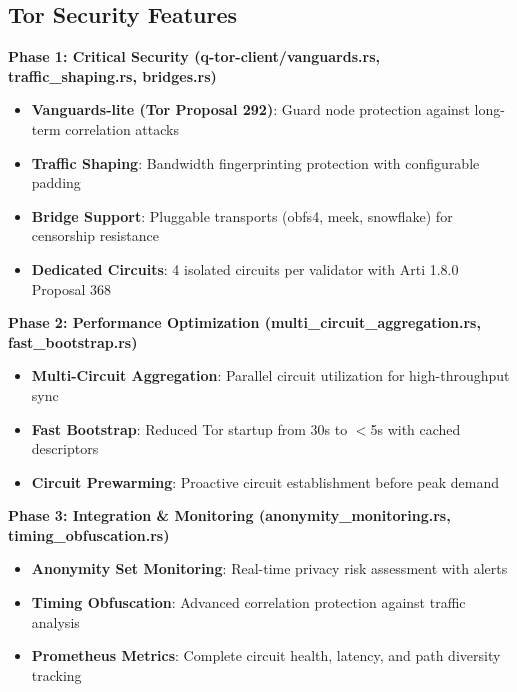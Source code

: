 \documentclass[12pt,a4paper]{article}
\begin{document}
\subsection{Tor Security Features}

\begin{statbox}
\textbf{Phase 1: Critical Security (q-tor-client/vanguards.rs, traffic\_shaping.rs, bridges.rs)}

\begin{itemize}
    \item \textbf{Vanguards-lite (Tor Proposal 292)}: Guard node protection against long-term correlation attacks
    \item \textbf{Traffic Shaping}: Bandwidth fingerprinting protection with configurable padding
    \item \textbf{Bridge Support}: Pluggable transports (obfs4, meek, snowflake) for censorship resistance
    \item \textbf{Dedicated Circuits}: 4 isolated circuits per validator with Arti 1.8.0 Proposal 368
\end{itemize}
\end{statbox}

\begin{statbox}
\textbf{Phase 2: Performance Optimization (multi\_circuit\_aggregation.rs, fast\_bootstrap.rs)}

\begin{itemize}
    \item \textbf{Multi-Circuit Aggregation}: Parallel circuit utilization for high-throughput sync
    \item \textbf{Fast Bootstrap}: Reduced Tor startup from 30s to $<$5s with cached descriptors
    \item \textbf{Circuit Prewarming}: Proactive circuit establishment before peak demand
\end{itemize}
\end{statbox}

\begin{statbox}
\textbf{Phase 3: Integration \& Monitoring (anonymity\_monitoring.rs, timing\_obfuscation.rs)}

\begin{itemize}
    \item \textbf{Anonymity Set Monitoring}: Real-time privacy risk assessment with alerts
    \item \textbf{Timing Obfuscation}: Advanced correlation protection against traffic analysis
    \item \textbf{Prometheus Metrics}: Complete circuit health, latency, and path diversity tracking
\end{itemize}
\end{statbox}
\end{document}
